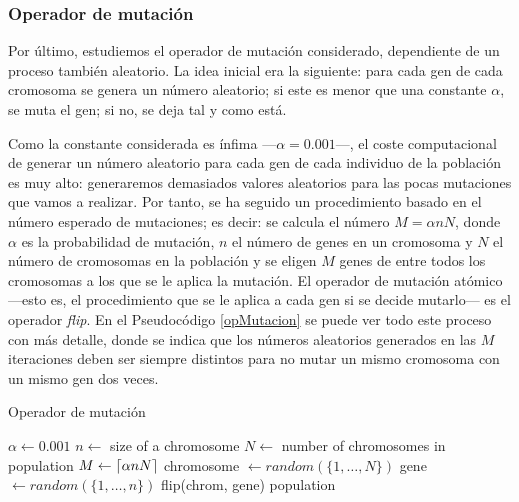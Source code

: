 \documentclass[a4paper, 11pt, titlepage]{article}
\begin{document}
    \subsubsection*{Operador de mutación}

    Por último, estudiemos el operador de mutación considerado, dependiente de un proceso también aleatorio. La idea inicial era la siguiente: para cada gen de cada cromosoma se genera un número aleatorio; si este es menor que una constante $\alpha$, se muta el gen; si no, se deja tal y como está.

    Como la constante considerada es ínfima ---$\alpha = 0.001$---, el coste computacional de generar un número aleatorio para cada gen de cada individuo de la población es muy alto: generaremos demasiados valores aleatorios para las pocas mutaciones que vamos a realizar. Por tanto, se ha seguido un procedimiento basado en el número esperado de mutaciones; es decir: se calcula el número $M = \alpha n N$, donde $\alpha$ es la probabilidad de mutación, $n$ el número de genes en un cromosoma y $N$ el número de cromosomas en la población y se eligen $M$ genes de entre todos los cromosomas a los que se le aplica la mutación. El operador de mutación atómico ---esto es, el procedimiento que se le aplica a cada gen si se decide mutarlo--- es el operador \emph{flip}. En el Pseudocódigo \ref{opMutacion} se puede ver todo este proceso con más detalle, donde se indica que los números aleatorios generados en las $M$ iteraciones deben ser siempre distintos para no mutar un mismo cromosoma con un mismo gen dos veces.

    \begin{algorithm}
        \caption{Operador de mutación}\label{opMutacion}
        \begin{algorithmic}[1]
            \State $\alpha \gets 0.001$
            \State $n \gets$ size of a chromosome
            \State $N \gets$ number of chromosomes in population
            \State $M \gets \lceil\alpha n N\rceil$
             
                \State{}
                \State chromosome $\gets random(\{1,\dots,N\})$
                \State gene $\gets random(\{1,\dots,n\})$
                \State flip(chrom, gene)
            \EndFor
            \State \Return population
        \end{algorithmic}
    \end{algorithm}
\end{document}
